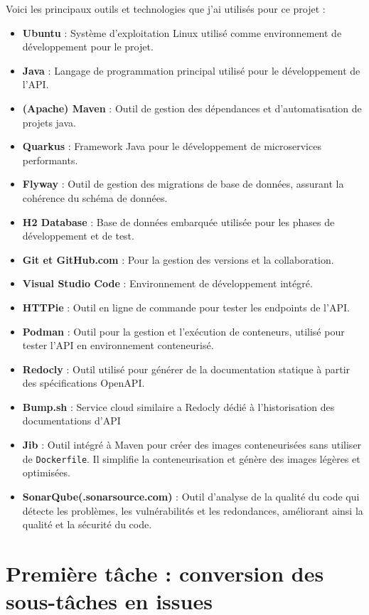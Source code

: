 \documentclass[11pt]{article}
\begin{document}
		Voici les principaux outils et technologies que j’ai utilisés pour ce projet :
	\begin{itemize}
		\item \textbf{Ubuntu} : Système d'exploitation Linux utilisé comme environnement de développement pour le projet.
		\item \textbf{Java} : Langage de programmation principal utilisé pour le développement de l'API.
		\item \textbf{(Apache) Maven} : Outil de gestion des dépendances et d'automatisation de projets java.
		\item \textbf{Quarkus} : Framework Java pour le développement de microservices performants.
		\item \textbf{Flyway} : Outil de gestion des migrations de base de données, assurant la cohérence du schéma de données.
		\item \textbf{H2 Database} : Base de données embarquée utilisée pour les phases de développement et de test.
		\item \textbf{Git et GitHub.com} : Pour la gestion des versions et la collaboration.
		\item \textbf{Visual Studio Code} : Environnement de développement intégré.
		\item \textbf{HTTPie} : Outil en ligne de commande pour tester les endpoints de l'API.
		\item \textbf{Podman} : Outil pour la gestion et l'exécution de conteneurs, utilisé pour tester l'API en environnement conteneurisé.
		\item \textbf{Redocly} : Outil utilisé pour générer de la documentation statique à partir des spécifications OpenAPI.
		\item\textbf{Bump.sh} : Service cloud similaire a Redocly dédié à l'historisation des documentations d'API
		\item \textbf{Jib} : Outil intégré à Maven pour créer des images conteneurisées sans utiliser de \texttt{Dockerfile}. Il simplifie la conteneurisation et génère des images légères et optimisées.
		\item \textbf{SonarQube(.sonarsource.com)} : Outil d'analyse de la qualité du code qui détecte les problèmes, les vulnérabilités et les redondances, améliorant ainsi la qualité et la sécurité du code.
	\end{itemize}
		
		\section{Première tâche : conversion des sous-tâches en issues}
		
\end{document}
